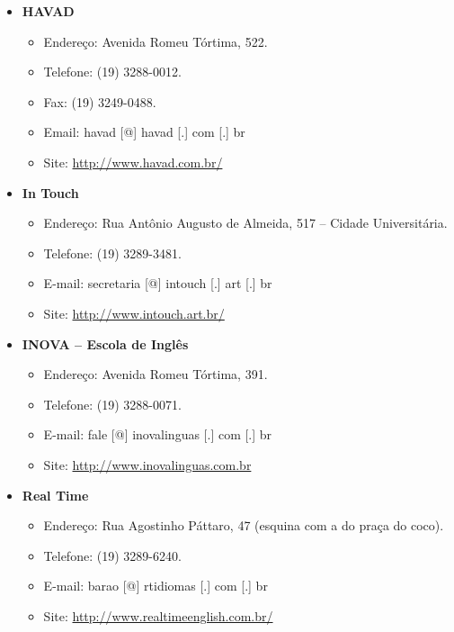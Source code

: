 \begin{itemize}
\item  \textbf{HAVAD}
\begin{itemize}
\item  Endereço: Avenida Romeu Tórtima, 522.
\item  Telefone: (19) 3288-0012.
\item  Fax: (19) 3249-0488.
\item  Email: havad [@] havad [.] com [.] br
\item  Site: \url{http://www.havad.com.br/}
\end{itemize}
\end{itemize}

\begin{itemize}
\item  \textbf{In Touch}
\begin{itemize}
\item  Endereço: Rua Antônio Augusto de Almeida, 517 -- Cidade Universitária.
\item  Telefone: (19) 3289-3481.
\item  E-mail: secretaria [@] intouch [.] art [.] br
\item  Site: \url{http://www.intouch.art.br/}
\end{itemize}
\end{itemize}

\begin{itemize}
\item  \textbf{INOVA -- Escola de Inglês}
\begin{itemize}
\item  Endereço: Avenida Romeu Tórtima, 391.
\item  Telefone: (19) 3288-0071.
\item  E-mail: fale [@] inovalinguas [.] com [.] br
\item  Site: \url{http://www.inovalinguas.com.br}
\end{itemize}
\end{itemize}

\begin{itemize}
\item  \textbf{Real Time}
\begin{itemize}
\item  Endereço: Rua Agostinho Páttaro, 47 (esquina com a do praça do coco).
\item  Telefone: (19) 3289-6240.
\item  E-mail: barao [@] rtidiomas [.] com [.] br
\item  Site: \url{http://www.realtimeenglish.com.br/}
\end{itemize}
\end{itemize}

